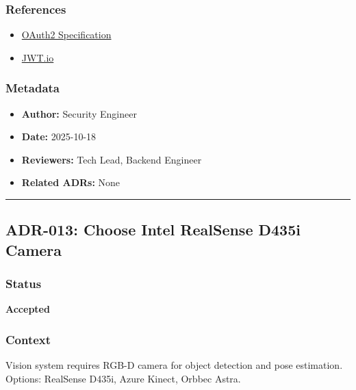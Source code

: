 \documentclass[
]{article}
\providecommand{\tightlist}{%
  \setlength{\itemsep}{0pt}\setlength{\parskip}{0pt}}
\begin{document}
\hypertarget{references-11}{%
\subsubsection{References}\label{references-11}}

\begin{itemize}
\tightlist
\item
  \href{https://oauth.net/2/}{OAuth2 Specification}
\item
  \href{https://jwt.io/}{JWT.io}
\end{itemize}

\hypertarget{metadata-11}{%
\subsubsection{Metadata}\label{metadata-11}}

\begin{itemize}
\tightlist
\item
  \textbf{Author:} Security Engineer
\item
  \textbf{Date:} 2025-10-18
\item
  \textbf{Reviewers:} Tech Lead, Backend Engineer
\item
  \textbf{Related ADRs:} None
\end{itemize}

\begin{center}\rule{0.5\linewidth}{0.5pt}\end{center}

\hypertarget{adr-013-choose-intel-realsense-d435i-camera}{%
\subsection{ADR-013: Choose Intel RealSense D435i
Camera}\label{adr-013-choose-intel-realsense-d435i-camera}}

\hypertarget{status-12}{%
\subsubsection{Status}\label{status-12}}

\textbf{Accepted}

\hypertarget{context-12}{%
\subsubsection{Context}\label{context-12}}

Vision system requires RGB-D camera for object detection and pose
estimation. Options: RealSense D435i, Azure Kinect, Orbbec Astra.
\end{document}
